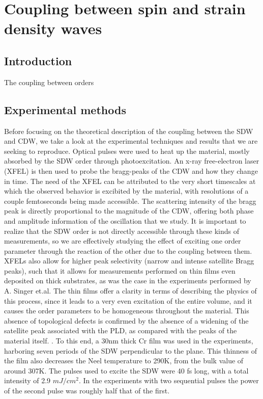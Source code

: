 \chapter{Coupling between spin and strain density waves}
\section{Introduction}
The coupling between orders

\section{Experimental methods}
Before focusing on the theoretical description of the coupling between the SDW and CDW, we take a look at the experimental techniques and results that we are seeking to reproduce. Optical pulses were used to heat up the material, mostly absorbed by the SDW order through photoexcitation. An x-ray free-electron laser (XFEL) is then used to probe the bragg-peaks of the CDW and how they change in time. The need of the XFEL can be attributed to the very short timescales at which the observed behavior is excibited by the material, with resolutions of a couple femtoseconds being made accessible.
The scattering intensity of the bragg peak is directly proportional to the magnitude of the CDW, offering both phase and amplitude information of the oscillation that we study. It is important to realize that the SDW order is not directly accessible through these kinds of measurements, so we are effectively studying the effect of exciting one order parameter through the reaction of the other due to the coupling between them.
XFELs also allow for higher peak selectivity (narrow and intense satellite Bragg peaks), such that it allows for measurements performed on thin films even deposited on thick substrates, as was the case in the experiments performed by A. Singer et.al. The thin films offer a clarity in terms of describing the physics of this process, since it leads to a very even excitation of the entire volume, and it causes the order parameters to be homogeneous throughout the material. This absence of topological defects is confirmed by the absence of a widening of the satellite peak associated with the PLD, as compared with the peaks of the material itself. .
To this end, a 30nm thick Cr film was used in the experiments, harboring seven periods of the SDW perpendicular to the plane. This thinness of the film also decreases the Neel temperature to 290K, from the bulk value of around 307K. The pulses used to excite the SDW were 40 fs long, with a total intensity of 2.9 $mJ/cm^2$. In the experiments with two sequential pulses the power of the second pulse was roughly half that of the first.

